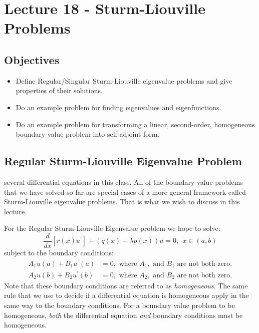 \chapter{Lecture 18 - Sturm-Liouville Problems}
\label{ch:lec18}
\section{Objectives}
\begin{itemize}
\item Define Regular/Singular Sturm-Liouville eigenvalue problems and give properties of their solutions.
\item Do an example problem for finding eigenvalues and eigenfunctions.
\item Do an example problem for transforming a linear, second-order, homogeneous boundary value problem into self-adjoint form.
\end{itemize}

\section{Regular Sturm-Liouville Eigenvalue Problem} 
 several differential equations in this class.  All of the boundary value problems that we have solved so far are special cases of a more general framework called Sturm-Liouville eigenvalue problems. That is what we wish to discuss in this lecture.

For the Regular Sturm-Liouville Eigenvalue problem we hope to solve:
\begin{equation}
\frac{d}{dx}\left[r(x)u^{\prime}\right] + \left(q(x) + \lambda p(x)\right)u = 0,  \ \ x\in(a,b)
\label{eq:sturm-liouville-evp}
\end{equation}
subject to the boundary conditions:
\begin{align*}
A_1u(a) + B_1u^{\prime}(a) &= 0, \text{ where }A_1,\text{ and }B_1\text{ are not both zero.} \\
A_2u(b) + B_2u^{\prime}(b) &= 0, \text{ where }A_2,\text{ and }B_2\text{ are not both zero.}
\end{align*}
Note that these boundary conditions are referred to as \emph{homogeneous}.  The same rule that we use to decide if a differential equation is homogeneous apply in the same way to the boundary conditions.  For a boundary value problem to be homogeneous, \emph{both} the differential equation \emph{and} boundary conditions must be homogeneous.

